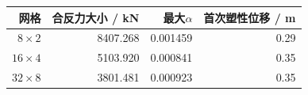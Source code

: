 \begin{tabular}{rrrr}\toprule 网格 & 合反力大小 / kN & 最大$\alpha$ & 首次塑性位移 / m\\\midrule
$8\times2$ & 8407.268 & 0.001459 & 0.29\\
$16\times4$ & 5103.920 & 0.000841 & 0.35\\
$32\times8$ & 3801.481 & 0.000923 & 0.35\\
\bottomrule\end{tabular}